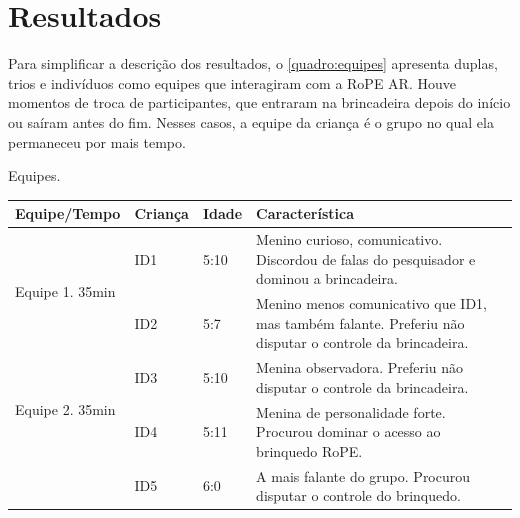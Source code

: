 \chapter{Resultados}
\label{c_resultados}

Para simplificar a descrição dos resultados, o \autoref{quadro:equipes} apresenta duplas, trios e indivíduos como equipes que interagiram com a RoPE AR. Houve momentos de troca de participantes, que entraram na brincadeira depois do início ou saíram antes do fim. Nesses casos, a equipe da criança é o grupo no qual ela permaneceu por mais tempo.

\begin{quadro}[!h]
    \caption{Equipes.}
    \label{quadro:equipes}
    \centering
    {
        \begin{footnotesize}
        {\renewcommand{\arraystretch}{1.2}
        \begin{tabular}{|l|l|l|p{11cm}|} 
            \hline
            \textbf{ Equipe/Tempo }                         & \textbf{Criança } & \textbf{Idade} & \textbf{Característica} \\ 
            \hline
            \multirow{2}{*}{Equipe 1. 35min}                & ID1               & 5:10                         & Menino curioso, comunicativo. Discordou de falas do pesquisador e dominou a brincadeira.                           \\ 
            \cline{2-4}
                                                            & ID2               & 5:7                          & Menino menos comunicativo que ID1, mas também falante. Preferiu não disputar o controle da brincadeira.            \\ 
            \hline
            \multirow{2}{*}{Equipe 2. 35min}                & ID3               & 5:10                         & Menina observadora. Preferiu não disputar o controle da brincadeira.                                               \\ 
            \cline{2-4}
            \multicolumn{1}{|c|}{}                          & ID4               & 5:11                         & Menina de personalidade forte. Procurou dominar o acesso ao brinquedo RoPE.                                        \\ 
            \cline{2-4}
            \multicolumn{1}{|c|}{}                          & ID5               & 6:0                          & A mais falante do grupo. Procurou disputar o controle do brinquedo.                                                \\ 

\end{tabular}}
\end{footnotesize}}
\end{quadro}
